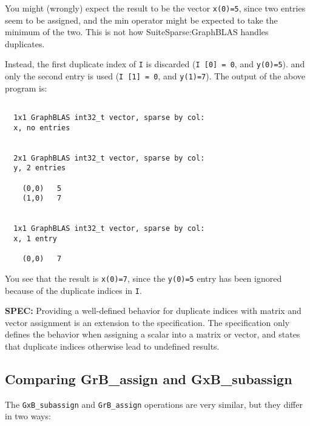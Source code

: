 \documentclass[12pt]{article}
\begin{document}
You might (wrongly) expect the result to be the vector \verb'x(0)=5', since
two entries seem to be assigned, and the min operator might be expected to
take the minimum of the two.  This is not how SuiteSparse:GraphBLAS handles
duplicates.

Instead, the first duplicate index of \verb'I' is discarded
(\verb'I [0] = 0', and \verb'y(0)=5').
and only the second entry is used
(\verb'I [1] = 0', and \verb'y(1)=7').
The output of the above program is:

{\small
\begin{verbatim}

  1x1 GraphBLAS int32_t vector, sparse by col:
  x, no entries


  2x1 GraphBLAS int32_t vector, sparse by col:
  y, 2 entries

    (0,0)   5
    (1,0)   7


  1x1 GraphBLAS int32_t vector, sparse by col:
  x, 1 entry

    (0,0)   7

\end{verbatim}}

You see that the result is \verb'x(0)=7', since the \verb'y(0)=5' entry
has been ignored because of the duplicate indices in \verb'I'.

\begin{alert}
{\bf SPEC:} Providing a well-defined behavior for duplicate
indices with matrix and vector assignment is an extension to the specification.
The specification only defines the behavior when assigning a scalar into a matrix
or vector, and states that duplicate indices otherwise lead to undefined
results.
\end{alert}


\newpage
\subsection{Comparing {\sf GrB\_assign} and {\sf GxB\_subassign}} %
\label{compare_assign}

The \verb'GxB_subassign' and \verb'GrB_assign' operations are very similar, but
they differ in two ways:
\end{document}
